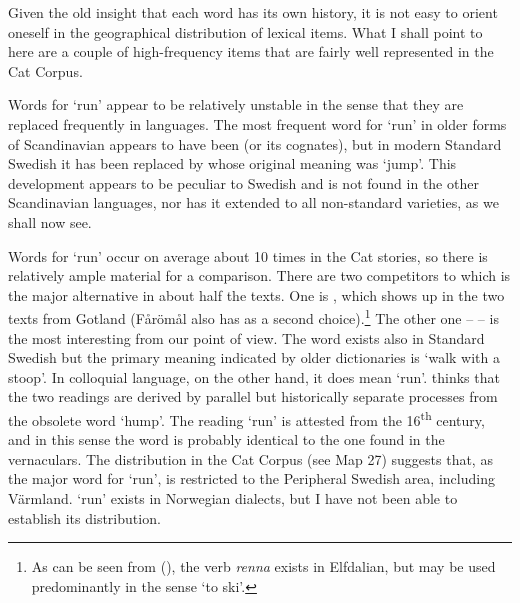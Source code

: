 
Given the old insight that each word has its own history, it is not easy to orient oneself in the geographical distribution of lexical items. What I shall point to here are a couple of high-frequency items that are fairly well represented in the Cat Corpus.


Words for ‘run’ appear to be relatively unstable in the sense that they are replaced frequently in languages. The most frequent word for ‘run’ in older forms of Scandinavian appears to have been (or its cognates), but in modern Standard Swedish it has been replaced by whose original meaning was ‘jump’. This development appears to be peculiar to Swedish and is not found in the other Scandinavian languages, nor has it extended to all non-standard varieties, as we shall now see. 


Words for ‘run’ occur on average about 10 times in the Cat stories, so there is relatively ample material for a comparison. There are two competitors to which is the major alternative in about half the texts. One is , which shows up in the two texts from Gotland (Fårömål also has  as a second choice).\footnote{ As can be seen from (), the verb \textit{renna} exists in Elfdalian, but may be used predominantly in the sense ‘to ski’.} The other one –  – is the most interesting from our point of view. The word exists also in Standard Swedish but the primary meaning indicated by older dictionaries is ‘walk with a stoop’. In colloquial language, on the other hand, it does mean ‘run’. \citet[371]{Hellquist1922} thinks that the two readings are derived by parallel but historically separate processes from the obsolete word  ‘hump’. The reading ‘run’ is attested from the 16\textsuperscript{th} century, and in this sense the word is probably identical to the one found in the vernaculars. The distribution in the Cat Corpus (see Map 27) suggests that, as the major word for ‘run’,  is restricted to the Peripheral Swedish area, including Värmland.  ‘run’ exists in Norwegian dialects, but I have not been able to establish its distribution.

